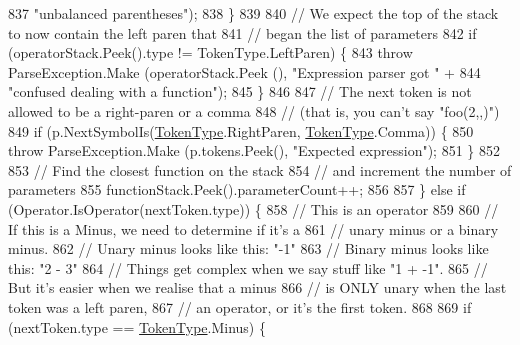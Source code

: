 \begin{DoxyCode}
837                                 \textcolor{stringliteral}{"unbalanced parentheses"});
838                         \}
839 
840                         \textcolor{comment}{// We expect the top of the stack to now contain the left paren that}
841                         \textcolor{comment}{// began the list of parameters}
842                         \textcolor{keywordflow}{if} (operatorStack.Peek().type != TokenType.LeftParen) \{
843                             \textcolor{keywordflow}{throw} ParseException.Make (operatorStack.Peek (), \textcolor{stringliteral}{"Expression parser got "} +
844                                 \textcolor{stringliteral}{"confused dealing with a function"});
845                         \}
846 
847                         \textcolor{comment}{// The next token is not allowed to be a right-paren or a comma}
848                         \textcolor{comment}{// (that is, you can't say "foo(2,,)")}
849                         \textcolor{keywordflow}{if} (p.NextSymbolIs(\hyperlink{a00053_a301aa7c866593a5b625a8fc158bbeace}{TokenType}.RightParen, 
      \hyperlink{a00053_a301aa7c866593a5b625a8fc158bbeace}{TokenType}.Comma)) \{
850                             \textcolor{keywordflow}{throw} ParseException.Make (p.tokens.Peek(), \textcolor{stringliteral}{"Expected expression"});
851                         \}
852 
853                         \textcolor{comment}{// Find the closest function on the stack}
854                         \textcolor{comment}{// and increment the number of parameters}
855                         functionStack.Peek().parameterCount++;
856 
857                     \} \textcolor{keywordflow}{else} \textcolor{keywordflow}{if} (Operator.IsOperator(nextToken.type)) \{
858                         \textcolor{comment}{// This is an operator}
859 
860                         \textcolor{comment}{// If this is a Minus, we need to determine if it's a}
861                         \textcolor{comment}{// unary minus or a binary minus.}
862                         \textcolor{comment}{// Unary minus looks like this: "-1"}
863                         \textcolor{comment}{// Binary minus looks like this: "2 - 3"}
864                         \textcolor{comment}{// Things get complex when we say stuff like "1 + -1".}
865                         \textcolor{comment}{// But it's easier when we realise that a minus}
866                         \textcolor{comment}{// is ONLY unary when the last token was a left paren,}
867                         \textcolor{comment}{// an operator, or it's the first token.}
868 
869                         \textcolor{keywordflow}{if} (nextToken.type == \hyperlink{a00053_a301aa7c866593a5b625a8fc158bbeace}{TokenType}.Minus) \{

\end{DoxyCode}
